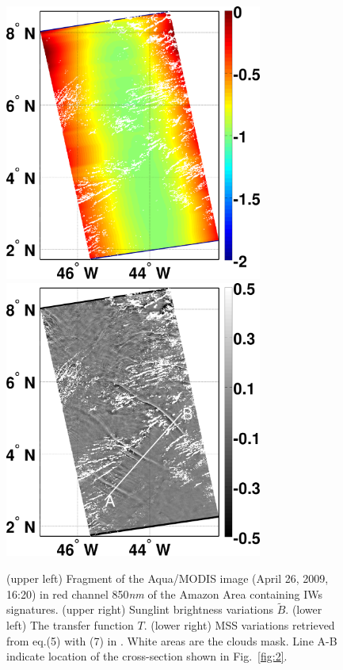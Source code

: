 \documentclass[draft,grl]{agutex}
\begin{document}
\begin{figure}
\\
\noindent\includegraphics[width=20pc]{fig1c}
\hfill
\noindent\includegraphics[width=20pc]{fig1d}
\caption{(upper left)  Fragment of the Aqua/MODIS image (April 26, 2009, 16:20) in red channel 850\textit{nm} of the Amazon Area containing IWs signatures. (upper right) Sunglint brightness variations $\tilde{B}$. (lower left) The transfer function $T$. (lower right) MSS variations retrieved from eq.(5) with (7) in \citep{Kudryavtsev2012a}. White areas are the clouds mask. Line A-B indicate location of the cross-section shown in Fig.~\ref{fig:2}.}
\label{fig:1}
\end{figure}
\end{document}
